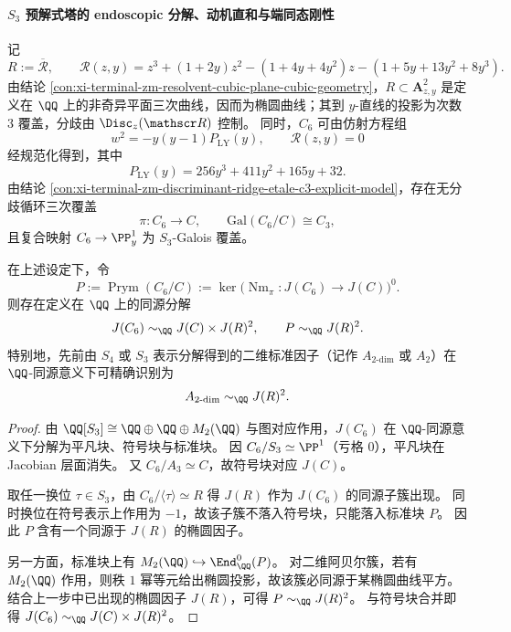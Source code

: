 \paragraph{\texorpdfstring{$S_3$}{S3} 预解式塔的 endoscopic 分解、动机直和与端同态刚性}\label{par:xi-terminal-zm-s3-endoscopic-motive-polarization-endomorphism-rigidity}
记
\[
R:=\overline{\mathcal R},\qquad
\mathscr R(z,y)=z^3+(1+2y)z^2-(1+4y+4y^2)z-(1+5y+13y^2+8y^3).
\]
由结论 \ref{con:xi-terminal-zm-resolvent-cubic-plane-cubic-geometry}，\(R\subset\mathbf A^2_{z,y}\) 是定义在 \(\QQ\) 上的非奇异平面三次曲线，因而为椭圆曲线；其到 \(y\)-直线的投影为次数 \(3\) 覆盖，分歧由 \(\Disc_z(\mathscr R)\) 控制。
同时，\(C_6\) 可由仿射方程组
\[
w^2=-y(y-1)P_{\mathrm{LY}}(y),\qquad \mathscr R(z,y)=0
\]
经规范化得到，其中
\[
P_{\mathrm{LY}}(y)=256y^3+411y^2+165y+32.
\]
由结论 \ref{con:xi-terminal-zm-discriminant-ridge-etale-c3-explicit-model}，存在无分歧循环三次覆盖
\[
\pi:C_6\to C,\qquad \mathrm{Gal}(C_6/C)\cong C_3,
\]
且复合映射 \(C_6\to\PP^1_y\) 为 \(S_3\)-Galois 覆盖。

\begin{theorem}\label{thm:xi-terminal-zm-s3-endoscopic-homology-a2-identification}
在上述设定下，令
\[
P:=\operatorname{Prym}(C_6/C):=\ker\!\bigl(\operatorname{Nm}_{\pi}:J(C_6)\to J(C)\bigr)^0.
\]
则存在定义在 \(\QQ\) 上的同源分解
\[
J(C_6)\sim_{\QQ}J(C)\times J(R)^2,
\qquad
P\sim_{\QQ}J(R)^2.
\]
特别地，先前由 \(S_4\) 或 \(S_3\) 表示分解得到的二维标准因子（记作 \(A_{2\text{-}\mathrm{dim}}\) 或 \(A_2\)）在 \(\QQ\)-同源意义下可精确识别为
\[
A_{2\text{-}\mathrm{dim}}\sim_{\QQ}J(R)^2.
\]
\end{theorem}
\begin{proof}
由
\(
\QQ[S_3]\cong \QQ\oplus\QQ\oplus M_2(\QQ)
\)
与图对应作用，\(J(C_6)\) 在 \(\QQ\)-同源意义下分解为平凡块、符号块与标准块。
因 \(C_6/S_3\simeq\PP^1\)（亏格 \(0\)），平凡块在 Jacobian 层面消失。
又 \(C_6/A_3\simeq C\)，故符号块对应 \(J(C)\)。

取任一换位 \(\tau\in S_3\)，由
\(
C_6/\langle\tau\rangle\simeq R
\)
得 \(J(R)\) 作为 \(J(C_6)\) 的同源子簇出现。
同时换位在符号表示上作用为 \(-1\)，故该子簇不落入符号块，只能落入标准块 \(P\)。
因此 \(P\) 含有一个同源于 \(J(R)\) 的椭圆因子。

另一方面，标准块上有
\(
M_2(\QQ)\hookrightarrow \End^0_{\QQ}(P)
\)。
对二维阿贝尔簇，若有 \(M_2(\QQ)\) 作用，则秩 \(1\) 幂等元给出椭圆投影，故该簇必同源于某椭圆曲线平方。
结合上一步中已出现的椭圆因子 \(J(R)\)，可得
\(
P\sim_{\QQ}J(R)^2
\)。
与符号块合并即得
\(
J(C_6)\sim_{\QQ}J(C)\times J(R)^2
\)。
\end{proof}

